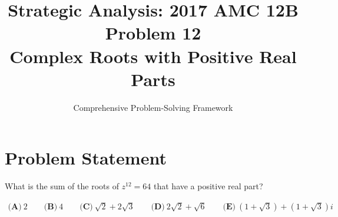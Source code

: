 \documentclass[11pt]{article}
\title{\textbf{Strategic Analysis: 2017 AMC 12B Problem 12} \\ Complex Roots with Positive Real Parts}
\author{Comprehensive Problem-Solving Framework}
\date{}
\begin{document}
\maketitle

\section*{Problem Statement}

What is the sum of the roots of $z^{12}=64$ that have a positive real part?

\begin{align*}
\textbf{(A)}\ 2 \qquad \textbf{(B)}\ 4 \qquad \textbf{(C)}\ \sqrt{2}+2\sqrt{3} \qquad \textbf{(D)}\ 2\sqrt{2}+\sqrt{6} \qquad \textbf{(E)}\ (1+\sqrt{3}) + (1+\sqrt{3})i
\end{align*}

\vspace{0.5cm}
\end{document}
